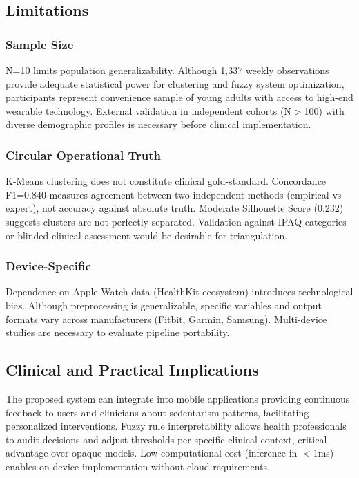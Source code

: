 \documentclass[journal,twoside,web]{ieeecolor}
\begin{document}
\subsection{Limitations}

\subsubsection{Sample Size}
N=10 limits population generalizability. Although 1,337 weekly observations provide adequate statistical power for clustering and fuzzy system optimization, participants represent convenience sample of young adults with access to high-end wearable technology. External validation in independent cohorts (N$>$100) with diverse demographic profiles is necessary before clinical implementation.

\subsubsection{Circular Operational Truth}
K-Means clustering does not constitute clinical gold-standard. Concordance F1=0.840 measures agreement between two independent methods (empirical vs expert), not accuracy against absolute truth. Moderate Silhouette Score (0.232) suggests clusters are not perfectly separated. Validation against IPAQ categories or blinded clinical assessment would be desirable for triangulation.

\subsubsection{Device-Specific}
Dependence on Apple Watch data (HealthKit ecosystem) introduces technological bias. Although preprocessing is generalizable, specific variables and output formats vary across manufacturers (Fitbit, Garmin, Samsung). Multi-device studies are necessary to evaluate pipeline portability.

\subsection{Clinical and Practical Implications}
The proposed system can integrate into mobile applications providing continuous feedback to users and clinicians about sedentarism patterns, facilitating personalized interventions. Fuzzy rule interpretability allows health professionals to audit decisions and adjust thresholds per specific clinical context, critical advantage over opaque models. Low computational cost (inference in $<$1ms) enables on-device implementation without cloud requirements.
\end{document}
